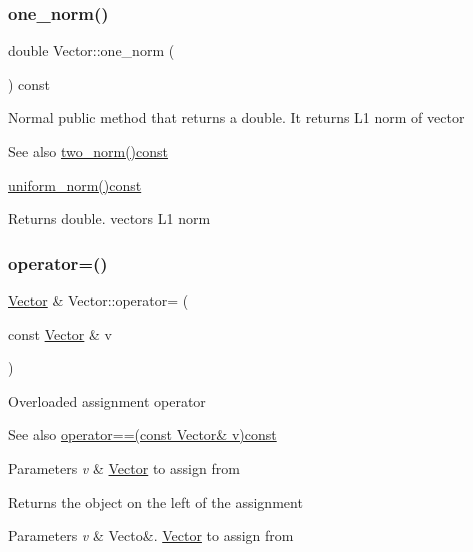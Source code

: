 \subsubsection{\texorpdfstring{one\+\_\+norm()}{one\_norm()}}
{\footnotesize\ttfamily double Vector\+::one\+\_\+norm (\begin{DoxyParamCaption}{ }\end{DoxyParamCaption}) const}

Normal public method that returns a double. It returns L1 norm of vector \begin{DoxySeeAlso}{See also}
\hyperlink{class_vector_a4f501290a50d057bb6c57ea64d7e70a4}{two\+\_\+norm()const} 

\hyperlink{class_vector_a50b72131eaf3698a9876d99ab6912a32}{uniform\+\_\+norm()const} 
\end{DoxySeeAlso}
\begin{DoxyReturn}{Returns}
double. vectors L1 norm 
\end{DoxyReturn}
\mbox{\label{class_vector_ae48c467a9f65d60e2f7455aba4ca1239}} 
\subsubsection{\texorpdfstring{operator=()}{operator=()}}
{\footnotesize\ttfamily \hyperlink{class_vector}{Vector} \& Vector\+::operator= (\begin{DoxyParamCaption}\item[{const \hyperlink{class_vector}{Vector} \&}]{v }\end{DoxyParamCaption})}

Overloaded assignment operator \begin{DoxySeeAlso}{See also}
\hyperlink{class_vector_ade5fbd0cd01b034d1907e0c93433320c}{operator==(const Vector\& v)const} 
\end{DoxySeeAlso}

\begin{DoxyParams}{Parameters}
{\em v} & \hyperlink{class_vector}{Vector} to assign from \\
\hline
\end{DoxyParams}
\begin{DoxyReturn}{Returns}
the object on the left of the assignment 
\end{DoxyReturn}

\begin{DoxyParams}{Parameters}
{\em v} & Vecto\&. \hyperlink{class_vector}{Vector} to assign from \\
\hline
\end{DoxyParams}
\mbox{\label{class_vector_ade5fbd0cd01b034d1907e0c93433320c}} 
